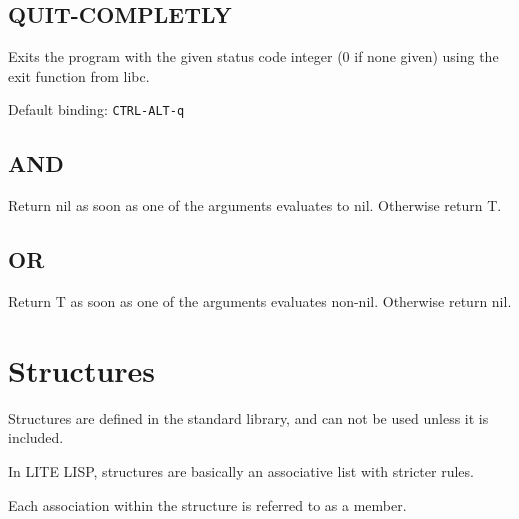 \documentclass[
letterpaper,
oneside,
]{memoir}
\begin{document}
\vspace{1em}

\section{QUIT-COMPLETLY}

\noindent
Exits the program with the given status code integer (0 if none given) using the exit function from libc.

Default binding: \texttt{CTRL-ALT-q}

\vspace{1em}

\section{AND}

\noindent
Return nil as soon as one of the arguments evaluates to nil. Otherwise return T.

\vspace{1em}

\section{OR}

\noindent
Return T as soon as one of the arguments evaluates non-nil. Otherwise return nil.

\vspace{1em}

\chapter{Structures}

Structures are defined in the standard library, and can not be used unless it is included.

\vspace{1em}
\noindent
In LITE LISP, structures are basically an associative list with stricter rules.

\vspace{1em}
\noindent
Each association within the structure is referred to as a member.
\end{document}

